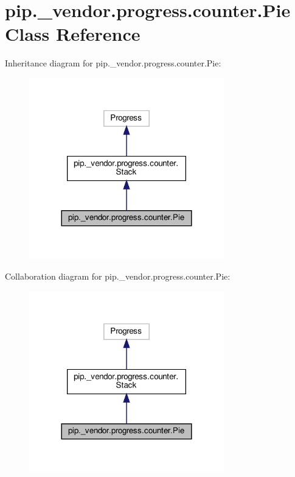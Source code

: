 \hypertarget{classpip_1_1__vendor_1_1progress_1_1counter_1_1Pie}{}\section{pip.\+\_\+vendor.\+progress.\+counter.\+Pie Class Reference}
\label{classpip_1_1__vendor_1_1progress_1_1counter_1_1Pie}


Inheritance diagram for pip.\+\_\+vendor.\+progress.\+counter.\+Pie\+:
\nopagebreak
\begin{figure}[H]
\begin{center}
\leavevmode
\includegraphics[width=240pt]{classpip_1_1__vendor_1_1progress_1_1counter_1_1Pie__inherit__graph}
\end{center}
\end{figure}


Collaboration diagram for pip.\+\_\+vendor.\+progress.\+counter.\+Pie\+:
\nopagebreak
\begin{figure}[H]
\begin{center}
\leavevmode
\includegraphics[width=240pt]{classpip_1_1__vendor_1_1progress_1_1counter_1_1Pie__coll__graph}
\end{center}
\end{figure}
